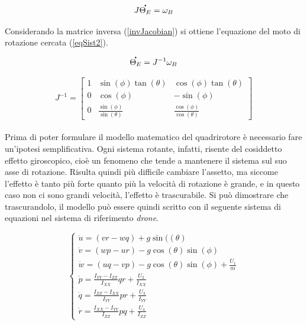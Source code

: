 \begin{equation}
	J\accentset{\mbox{\large\bfseries .}}{\Theta_E} = \omega_B
	\label{jacobian}
\end{equation}

Considerando la matrice inversa (\ref{invJacobian}) si ottiene l'equazione del moto di rotazione cercata (\ref{eqSist2}).

\begin{equation}
	\accentset{\mbox{\large\bfseries .}}{\Theta_E} = J^{-1}\omega_B
	\label{eqSist2}
\end{equation}

\begin{equation}
J^{-1}
=
\begin{bmatrix}
1 & \sin(\phi)\tan(\theta) & \cos(\phi)\tan(\theta)\\
0 & \cos(\phi) & -\sin(\phi)\\
0 & \frac{\sin(\phi)}{\sin(\theta)} & \frac{\cos(\phi)}{\cos(\theta)}
\end{bmatrix}
\label{invJacobian}
\end{equation}\\

Prima di poter formulare il modello matematico del quadrirotore è necessario fare un'ipotesi semplificativa. Ogni sistema rotante, infatti, risente del cosiddetto effetto giroscopico, cioè un fenomeno che tende a mantenere il sistema sul suo asse di rotazione. Risulta quindi più difficile cambiare l’assetto, ma siccome l’effetto è tanto più forte quanto più la velocità di rotazione è grande, e in questo caso non ci sono grandi velocità, l’effetto è trascurabile. Si può dimostrare che trascurandolo, il modello può essere quindi scritto con il seguente sistema di equazioni nel sistema di riferimento \emph{drone}.

\begin{equation}
	\begin{cases}
	\Dot{u} = (vr - wq) + g\sin((\theta) \\
	\Dot{v} = (wp - ur) - g\cos(\theta)\sin(\phi) \\
	\Dot{w} = (uq - vp) - g\cos(\theta)\sin(\phi) + \frac{U_1}{m} \\
	\Dot{p} = \frac{I_{YY} - I_{ZZ}}{I_{XX}}qr + \frac{U_2}{I_{XX}} \\
	\Dot{q} = \frac{I_{ZZ} - I_{XX}}{I_{YY}}pr + \frac{U_3}{I_{YY}} \\
	\Dot{r} = \frac{I_{XX} - I_{YY}}{I_{ZZ}}pq + \frac{U_4}{I_{ZZ}}
	\end{cases}
	\label{modelloQuadrirotoreDrone}
\end{equation}

